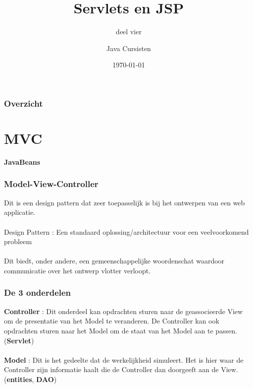 \documentclass{beamer}
\title{Servlets en JSP}
\subtitle{deel vier}
\author{Java Cursisten}
\institute{INTEC Brussel}
\date{\today}
\begin{document}
\begin{frame}

\titlepage

\end{frame}


\begin{frame}

\frametitle{Overzicht}
{\LARGE \tableofcontents}

\end{frame}


\section{MVC}


\begin{frame}

\begin{center}
\textbf{{\Huge JavaBeans}}
\end{center}

\end{frame}


\begin{frame}

\frametitle{\textbf{M}odel-\textbf{V}iew-\textbf{C}ontroller}

{\Large Dit is een design pattern dat zeer toepasselijk is bij
het ontwerpen van een web applicatie.\\~\\

Design Pattern : Een standaard oplossing/architectuur voor een veelvoorkomend probleem\\~\\

Dit biedt, onder andere, een gemeenschappelijke woordenschat waardoor communicatie over het ontwerp vlotter verloopt.}

\end{frame}

\begin{frame}

\frametitle{De 3 onderdelen}

{\Large \textbf{Controller} : Dit onderdeel kan opdrachten sturen naar de geassocieerde View om de presentatie van het Model te veranderen. De Controller kan ook opdrachten sturen naar het Model om de staat van het Model aan te passen. (\textbf{Servlet})\\~\\

\textbf{Model} : Dit is het gedeelte dat de werkelijkheid simuleert. Het is hier waar de Controller zijn informatie haalt die de Controller dan doorgeeft aan de View. (\textbf{entities}, \textbf{DAO})\\~\\}

\end{frame}
\end{document}
